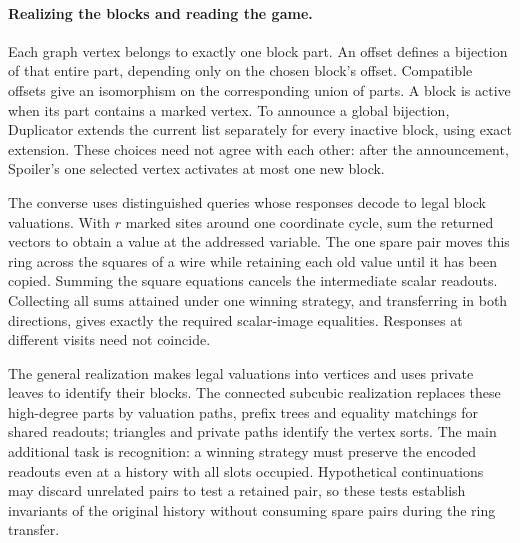 \documentclass[11pt]{article}
\theoremstyle{definition}
\begin{document}
\paragraph{Realizing the blocks and reading the game.}
Each graph vertex belongs to exactly one block part. An offset defines
a bijection of that entire part, depending only on the chosen block's
offset. Compatible offsets give an isomorphism on the corresponding
union of parts. A block is active when its part contains a marked vertex.
To announce a global bijection, Duplicator extends the
current list separately for every inactive block, using exact extension.
These choices need not agree with each other: after the announcement,
Spoiler's one selected vertex activates at most one new block.

The converse uses distinguished queries whose responses decode to legal
block valuations. With \(r\) marked sites around one coordinate cycle,
sum the returned vectors to obtain a value at the addressed variable.
The one spare pair moves this ring across the squares of a wire while
retaining each old value until it has been copied. Summing the square
equations cancels the intermediate scalar readouts. Collecting all sums
attained under one winning strategy, and transferring in both directions,
gives exactly the required scalar-image equalities. Responses at different
visits need not coincide.

The general realization makes legal valuations into vertices and uses
private leaves to identify their blocks. The connected subcubic
realization replaces these high-degree parts by valuation paths,
prefix trees and equality matchings for shared readouts; triangles and
private paths identify the vertex sorts. The main additional task is
recognition: a winning strategy must preserve the encoded readouts
even at a history with all slots occupied. Hypothetical continuations
may discard unrelated pairs to test a retained pair, so these tests
establish invariants of the original history without consuming spare
pairs during the ring transfer.
\end{document}

